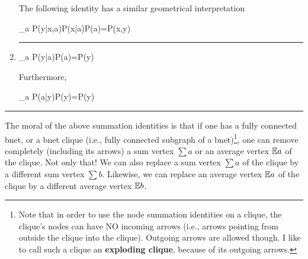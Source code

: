 \begin{enumerate}
The following identity has a similar geometrical interpretation

\beq
\sum_a P(y|x,a)P(x|a)P(a)=P(x,y)
\eeq

\beq
{}
\label{eq-med-sum-ee}
\eeq

\hrule

\item
\beq
\sum_a P(y|a)P(a)=P(y)
\eeq

\beq
{}
\label{eq-diff-priors}
\eeq
Furthermore,

\beq
\sum_a P(a|y)P(y)=P(y)
\eeq

\beq
{}
\label{eq-diff-priors-ee}
\eeq

\end{enumerate}
\hrule

The moral of the above summation identities is that
if one has a fully connected bnet, or a bnet clique
(i.e., fully connected subgraph of a bnet)\footnote{Note that in order to use the node summation identities on a clique,
the clique's nodes can have NO incoming arrows (i.e., arrows pointing from outside the clique into the clique). Outgoing arrows are allowed though. I like to call such a clique an {\bf exploding clique}, because of its outgoing arrows.},
one can remove completely (including its arrows) a sum vertex $\sum a$ or an average
vertex ${ \mathbb{E}} a$ of the clique. Not only that! We can also 
replace a sum vertex $\sum a$  of the clique by a different  sum vertex $\sum b$. Likewise, we can replace
an average vertex ${ \mathbb{E}} a$  of the clique by a different  average vertex ${ \mathbb{E}} b$.

%
%
%




